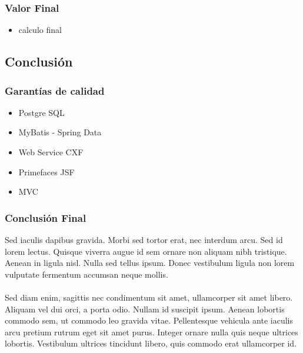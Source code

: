 \documentclass{beamer}
\begin{document}
\begin{frame}
\frametitle{Valor Final}
\begin{itemize}
\item calculo final
\end{itemize}
\end{frame}


\subsection{Conclusión}


\begin{frame}
\frametitle{Garantías de calidad}
\begin{itemize}
\item Postgre SQL
\item MyBatis - Spring Data
\item Web Service CXF
\item Primefaces JSF
\item MVC
\end{itemize}
\end{frame}


\begin{frame}
\frametitle{Conclusión Final}
Sed iaculis dapibus gravida. Morbi sed tortor erat, nec interdum arcu. Sed id lorem lectus. Quisque viverra augue id sem ornare non aliquam nibh tristique. Aenean in ligula nisl. Nulla sed tellus ipsum. Donec vestibulum ligula non lorem vulputate fermentum accumsan neque mollis.\\~\\

Sed diam enim, sagittis nec condimentum sit amet, ullamcorper sit amet libero. Aliquam vel dui orci, a porta odio. Nullam id suscipit ipsum. Aenean lobortis commodo sem, ut commodo leo gravida vitae. Pellentesque vehicula ante iaculis arcu pretium rutrum eget sit amet purus. Integer ornare nulla quis neque ultrices lobortis. Vestibulum ultrices tincidunt libero, quis commodo erat ullamcorper id.
\end{frame}

\end{document}
